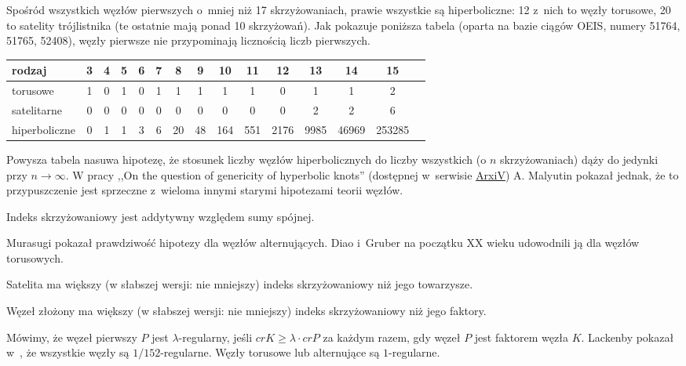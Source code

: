 Spośród wszystkich węzłów pierwszych o~mniej niż 17 skrzyżowaniach, prawie wszystkie są hiperboliczne: 12 z~nich to węzły torusowe, 20 to satelity trójlistnika (te ostatnie mają ponad 10 skrzyżowań).
Jak pokazuje poniższa tabela (oparta na bazie ciągów OEIS, numery 51764, 51765, 52408), węzły pierwsze nie przypominają licznością liczb pierwszych.

\renewcommand*{\arraystretch}{1.4}
\footnotesize
\begin{longtable}{lcccccccccccccc}
\hline
    \textbf{rodzaj} & 3 & 4 & 5 & 6 & 7 & 8  & 9  & 10  & 11  & 12   & 13   & 14    & 15     \\ \hline \endhead
    torusowe        & 1 & 0 & 1 & 0 & 1 & 1  & 1  & 1   & 1   & 0    & 1    & 1     & 2      \\
    satelitarne     & 0 & 0 & 0 & 0 & 0 & 0  & 0  & 0   & 0   & 0    & 2    & 2     & 6      \\
    hiperboliczne   & 0 & 1 & 1 & 3 & 6 & 20 & 48 & 164 & 551 & 2176 & 9985 & 46969 & 253285 \\
    \hline
\end{longtable}
\normalsize

Powysza tabela nasuwa hipotezę,
że stosunek liczby węzłów hiperbolicznych do liczby wszystkich
(o $n$ skrzyżowaniach) dąży do jedynki przy $n \to \infty$.
W pracy ,,On the question of genericity of hyperbolic knots'' (dostępnej w~serwisie \href{https://arxiv.org/abs/1612.03368v1}{ArxiV}) A. Malyutin pokazał jednak, że to przypuszczenie jest sprzeczne z~wieloma innymi starymi hipotezami teorii węzłów.

\begin{conjecture}
    Indeks skrzyżowaniowy jest addytywny względem sumy spójnej.
\end{conjecture}

Murasugi pokazał prawdziwość hipotezy dla węzłów alternujących.
Diao i~Gruber na początku XX wieku udowodnili ją dla węzłów torusowych.

\begin{conjecture}
    Satelita ma większy
    (w słabszej wersji: nie mniejszy)
    indeks skrzyżowaniowy niż jego towarzysze.
\end{conjecture}

\begin{conjecture}
    Węzeł złożony ma większy
    (w słabszej wersji: nie mniejszy)
    indeks skrzyżowaniowy niż jego faktory.
\end{conjecture}

Mówimy, że węzeł pierwszy $P$ jest $\lambda$-regularny,
jeśli $cr K \ge \lambda \cdot cr P$ za każdym razem,
gdy węzeł $P$ jest faktorem węzła $K$.
Lackenby pokazał w~\cite{lackenby09}, że wszystkie węzły są $1/152$-regularne.
Węzły torusowe lub alternujące są $1$-regularne.

